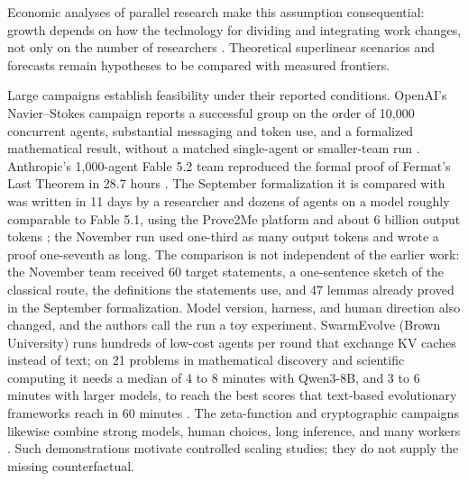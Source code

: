 Economic analyses of parallel research make this assumption consequential: growth depends on how the technology for dividing and integrating work changes, not only on the number of researchers \citep{trammell-parallelizability}. Theoretical superlinear scenarios and forecasts remain hypotheses \citep{bradshaw-swarm-exponent} to be compared with measured frontiers.

Large campaigns establish feasibility under their reported conditions. OpenAI's Navier--Stokes campaign reports a successful group on the order of 10,000 concurrent agents, substantial messaging and token use, and a formalized mathematical result, without a matched single-agent or smaller-team run \citep{openai-navier-stokes}. Anthropic's 1,000-agent Fable 5.2 team reproduced the formal proof of Fermat's Last Theorem in 28.7 hours \citep{anthropic-fable-team-scaling}. The September formalization it is compared with was written in 11 days by a researcher and dozens of agents on a model roughly comparable to Fable 5.1, using the Prove2Me platform and about 6 billion output tokens \citep{fermat-last-theorem}; the November run used one-third as many output tokens and wrote a proof one-seventh as long. The comparison is not independent of the earlier work: the November team received 60 target statements, a one-sentence sketch of the classical route, the definitions the statements use, and 47 lemmas already proved in the September formalization. Model version, harness, and human direction also changed, and the authors call the run a toy experiment. SwarmEvolve (Brown University) runs hundreds of low-cost agents per round that exchange KV caches instead of text; on 21 problems in mathematical discovery and scientific computing it needs a median of 4 to 8 minutes with Qwen3-8B, and 3 to 6 minutes with larger models, to reach the best scores that text-based evolutionary frameworks reach in 60 minutes \citep{swarmevolve}. The zeta-function and cryptographic campaigns likewise combine strong models, human choices, long inference, and many workers \citep{riemann-zeta-swarm,crypto-weaknesses}. Such demonstrations motivate controlled scaling studies; they do not supply the missing counterfactual.
